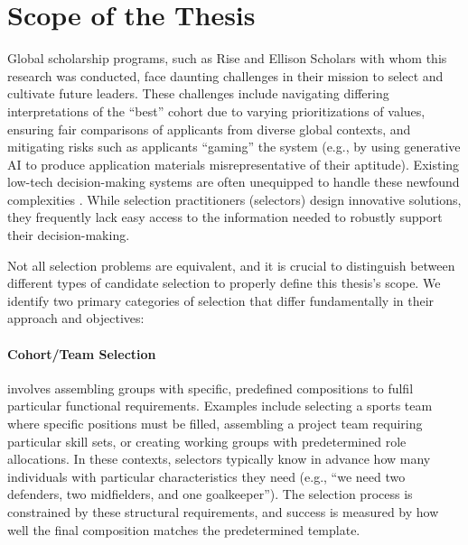 \section{Scope of the Thesis}

Global scholarship programs, such as Rise and Ellison Scholars with whom this research was conducted, face daunting challenges in their mission to select and cultivate future leaders. These challenges include navigating differing interpretations of the ``best'' cohort due to varying prioritizations of values, ensuring fair comparisons of applicants from diverse global contexts, and mitigating risks such as applicants ``gaming'' the system (e.g., by using generative AI to produce application materials misrepresentative of their aptitude). Existing low-tech decision-making systems are often unequipped to handle these newfound complexities \cite{Latzer_Hollnbuchner_Just_Saurwein_2014}. While selection practitioners (selectors) design innovative solutions, they frequently lack easy access to the information needed to robustly support their decision-making.

Not all selection problems are equivalent, and it is crucial to distinguish between different types of candidate selection to properly define this thesis's scope. We identify two primary categories of selection that differ fundamentally in their approach and objectives:

\paragraph{Cohort/Team Selection} involves assembling groups with specific, predefined compositions to fulfil particular functional requirements. Examples include selecting a sports team where specific positions must be filled, assembling a project team requiring particular skill sets, or creating working groups with predetermined role allocations. In these contexts, selectors typically know in advance how many individuals with particular characteristics they need (e.g., ``we need two defenders, two midfielders, and one goalkeeper''). The selection process is constrained by these structural requirements, and success is measured by how well the final composition matches the predetermined template.


